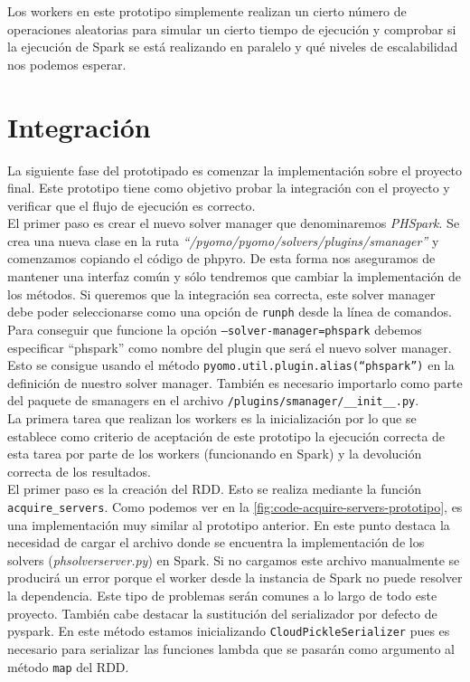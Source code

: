 Los workers en este prototipo simplemente realizan un cierto número de operaciones aleatorias para simular un cierto tiempo de ejecución y comprobar si la ejecución de Spark se está realizando en paralelo y qué niveles de escalabilidad nos podemos esperar.

\section{Integración}


La siguiente fase del prototipado es comenzar la implementación sobre el proyecto final. Este prototipo tiene como objetivo probar la integración con el proyecto y verificar que el flujo de ejecución es correcto.\\

El primer paso es crear el nuevo solver manager que denominaremos \textit{PHSpark}. Se crea una nueva clase en la ruta \textit{``/pyomo/pyomo/solvers/plugins/smanager''} y comenzamos copiando el código de phpyro. De esta forma nos aseguramos de mantener una interfaz común y sólo tendremos que cambiar la implementación de los métodos. 
Si queremos que la integración sea correcta, este solver manager debe poder seleccionarse como una opción de \texttt{runph} desde la línea de comandos. Para conseguir que funcione la opción \texttt{--solver-manager=phspark} debemos especificar ``phspark'' como nombre del plugin que será el nuevo solver manager. Esto se consigue usando el método \texttt{pyomo.util.plugin.alias(``phspark'')} en la definición de nuestro solver manager. También es necesario importarlo como parte del paquete de smanagers en el archivo \texttt{/plugins/smanager/\_\_init\_\_.py}.\\

La primera tarea que realizan los workers es la inicialización por lo que se establece como criterio de aceptación de este prototipo la ejecución correcta de esta tarea por parte de los workers (funcionando en Spark) y la devolución correcta de los resultados.\\

El primer paso es la creación del RDD. Esto se realiza mediante la función \texttt{acquire\_servers}. Como podemos ver en la \autoref{fig:code-acquire-servers-prototipo}, es una implementación muy similar al prototipo anterior. En este punto destaca la necesidad de cargar el archivo donde se encuentra la implementación de los solvers (\textit{phsolverserver.py}) en Spark. Si no cargamos este archivo manualmente se producirá un error porque el worker desde la instancia de Spark no puede resolver la dependencia. Este tipo de problemas serán comunes a lo largo de todo este proyecto. También cabe destacar la sustitución del serializador por defecto de pyspark. En este método estamos inicializando \texttt{CloudPickleSerializer} pues es necesario para serializar las funciones lambda que se pasarán como argumento al método \texttt{map} del RDD.\\

